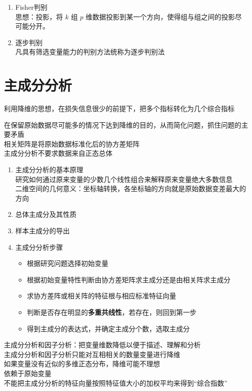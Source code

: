\documentclass[UTF8,10pt]{book}
\begin{document}
{\begin{enumerate}
	\[P(B_i | A) = \frac{P(B_j)P(A | B_j)}{\sum_{j=1}^{n} P(B_j)P(A | B_j )}\]
	\item
	Fisher判别\\
	思想：投影，将 \(k\) 组 \(p\)
	维数据投影到某一个方向，使得组与组之间的投影尽可能分开。
	\item
	逐步判别\\
	凡具有筛选变量能力的判别方法统称为逐步判别法
\end{enumerate}

\section{主成分分析}\label{header-n62}

利用降维的思想，在损失信息很少的前提下，把多个指标转化为几个综合指标

在保留原始数据尽可能多的情况下达到降维的目的，从而简化问题，抓住问题的主要矛盾\\
相关矩阵是将原始数据标准化后的协方差矩阵\\
主成分分析不要求数据来自正态总体

\begin{enumerate}
	\def\labelenumi{\arabic{enumi}.}
	\item
	主成分分析的基本原理\\
	研究如何通过原来变量的少数几个线性组合来解释原来变量绝大多数信息\\
	二维空间的几何意义：坐标轴转换，各坐标轴的方向就是原始数据变差最大的方向
	\item
	总体主成分及其性质
	\item
	样本主成分的导出
	\item
	主成分分析步骤
	
	\begin{itemize}
		\item
		根据研究问题选择初始变量
		\item
		根据初始变量特性判断由协方差矩阵求主成分还是由相关阵求主成分
		\item
		求协方差阵或相关阵的特征根与相应标准特征向量
		\item
		判断是否存在明显的\textbf{多重共线性}，若存在，则回到第一步
		\item
		得到主成分的表达式，并确定主成分个数，选取主成分
	\end{itemize}
\end{enumerate}

主成分分析和因子分析：把变量维数降低以便于描述、理解和分析\\
主成分分析和因子分析只能对互相相关的数量变量进行降维\\
如果变量没有近似的多维正态分布，降维可能不理想\\
依赖于原始变量\\
不能把主成分分析的特征向量按照特征值大小的加权平均来得到``综合指数''

}
\end{document}
